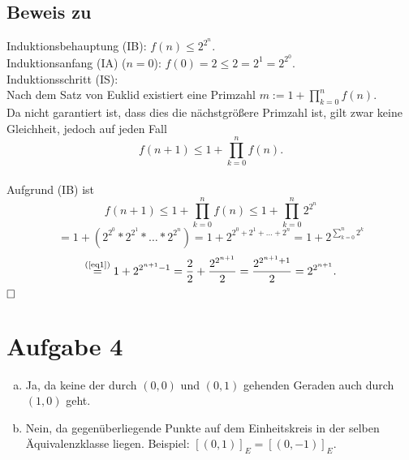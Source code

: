 \documentclass[12pt,a4paper]{article}
\newcommand{\qed}{\null\nobreak\hfill\square}
\begin{document}
\subsection*{Beweis zu }
Induktionsbehauptung (IB): $f(n) \leq 2^{2^n}$.\\
Induktionsanfang (IA) ($n = 0$): $f(0) = 2 \leq 2 = 2^1 = 2^{2^0}$.\\
Induktionsschritt (IS):\\
Nach dem Satz von Euklid existiert eine Primzahl $m := 1 + \prod\limits_{k = 0}^n f(n).$\\
Da nicht garantiert ist, dass dies die nächstgrößere Primzahl ist, gilt zwar keine Gleichheit, jedoch auf jeden Fall $$f(n + 1) \leq 1 + \prod\limits_{k = 0}^n f(n).$$\\
Aufgrund (IB) ist
$$f(n + 1) \leq 1 + \prod\limits_{k = 0}^n f(n) \leq 1 + \prod\limits_{k = 0}^n 2^{2^n}$$
$$= 1 + (2^{2^0} * 2^{2^1} * \dots * 2^{2^n}) = 1 + 2^{2^0 + 2^1 + \dots + 2^n} = 1 + 2^{\sum_{k=0}^{n} 2^k}$$
$$\overset{\text{(\ref{eq1})}}{=} 1 + 2^{2^{n + 1} - 1} = \frac{2}{2} + \frac{2^{2^{n + 1}}}{2} = \frac{2^{2^{n + 1} + 1}}{2} = 2^{2^{n + 1}}.$$
$\qed$


\section*{Aufgabe 4}

\begin{enumerate}[(a)]
    \item Ja, da keine der durch $(0, 0)$ und $(0, 1)$ gehenden Geraden auch durch $(1, 0)$ geht.
    \item Nein, da gegenüberliegende Punkte auf dem Einheitskreis in der selben Äquivalenzklasse liegen. Beispiel: $[(0, 1)]_E = [(0, -1)]_E$.
\end{enumerate}

\end{document}
